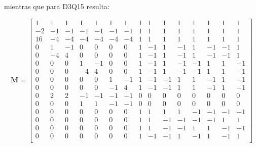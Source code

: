 mientras que para D3Q15 resulta:
\newpage

\setcounter{MaxMatrixCols}{15}
\begin{equation}
	\bm{M}=
	\begin{bmatrix}
	 1  &  1 &  1 &  1 &  1 & 1 &  1 &  1 &  1 & 1 & 1 & 1 & 1 & 1 & 1 \\
	 -2 & -1 & -1 & -1 & -1 & -1 & -1 & 1 & 1 & 1 & 1 & 1 & 1 & 1 & 1 \\
 	 16 & -4 & -4 & -4 & -4 & -4 & -4 & 1 & 1 & 1 & 1 & 1 & 1 & 1 & 1 \\
 	 0 & 1 & -1 & 0 & 0 & 0 & 0 & 1 & -1 & 1 & -1 & 1 & -1 & -1 & 1 \\
 	 0 & -4 & 4 & 0 & 0 & 0 & 0 & 1 & -1 & 1 & -1 & 1 & -1 & -1 & 1 \\
 	 0 & 0 & 0 & 1 & -1 & 0 & 0 & 1 & -1 & 1 & -1 & -1 & 1 & 1 & -1 \\
 	 0 & 0 & 0 & -4 & 4 & 0 & 0 & 1 & -1 & 1 & -1 & -1 & 1 & 1 & -1 \\
 	 0 & 0 & 0 & 0 & 0 & 1 & -1 & 1 & -1 & -1 & 1 & 1 & -1 & 1 & -1 \\
 	 0 & 0 & 0 & 0 & 0 & -1 & 4 & 1 & -1 & -1 & 1 & 1 & -1 & 1 & -1 \\
 	 0 & 2 & 2 & -1 & -1 & -1 & -1 & 0 & 0 & 0 & 0 & 0 & 0 & 0 & 0 \\
 	 0 & 0 & 0 & 1 & 1 & -1 & -1 & 0 & 0 & 0 & 0 & 0 & 0 & 0 & 0 \\
 	 0 & 0 & 0 & 0 & 0 & 0 & 0 & 1 & 1 & 1 & 1 & -1 & -1 & -1 & -1 \\
 	 0 & 0 & 0 & 0 & 0 & 0 & 0 & 1 & 1 & -1 & -1 & -1 & -1 & 1 & 1 \\
 	 0 & 0 & 0 & 0 & 0 & 0 & 0 & 1 & 1 & -1 & -1 & 1 & 1 & -1 & -1 \\
 	 0 & 0 & 0 & 0 & 0 & 0 & 0 & 1 & -1 & -1 & 1 & -1 & 1 & -1 & 1 \\
	\end{bmatrix}
	\label{eq:MTR_M_D2Q9}
\end{equation} 

